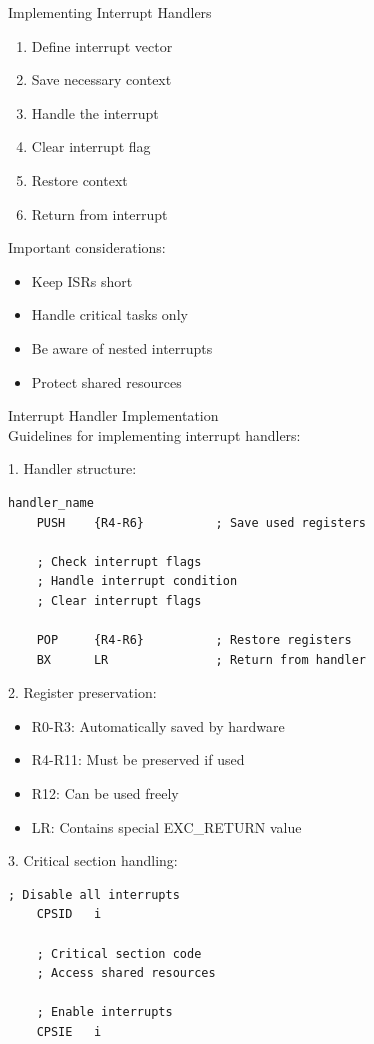\begin{KR}{Implementing Interrupt Handlers}

\begin{minipage}{0.5\linewidth}
\begin{enumerate}
  \item Define interrupt vector
  \item Save necessary context
  \item Handle the interrupt
  \item Clear interrupt flag
  \item Restore context
  \item Return from interrupt
\end{enumerate}
\end{minipage}
\begin{minipage}{0.49\linewidth}
Important considerations:
\begin{itemize}
  \item Keep ISRs short
  \item Handle critical tasks only
  \item Be aware of nested interrupts
  \item Protect shared resources
\end{itemize}
\end{minipage}
\end{KR}

\begin{KR}{Interrupt Handler Implementation}\\
Guidelines for implementing interrupt handlers:

1. Handler structure:
\begin{lstlisting}[language=armasm, style=basesmol]
handler_name
    PUSH    {R4-R6}          ; Save used registers
    
    ; Check interrupt flags
    ; Handle interrupt condition
    ; Clear interrupt flags
    
    POP     {R4-R6}          ; Restore registers
    BX      LR               ; Return from handler
\end{lstlisting}

2. Register preservation:
\begin{itemize}
  \item R0-R3: Automatically saved by hardware
  \item R4-R11: Must be preserved if used
  \item R12: Can be used freely
  \item LR: Contains special EXC\_RETURN value
\end{itemize}

3. Critical section handling:
\begin{lstlisting}[language=armasm, style=basesmol]
    ; Disable all interrupts
    CPSID   i
    
    ; Critical section code
    ; Access shared resources
    
    ; Enable interrupts
    CPSIE   i
\end{lstlisting}
\end{KR}

